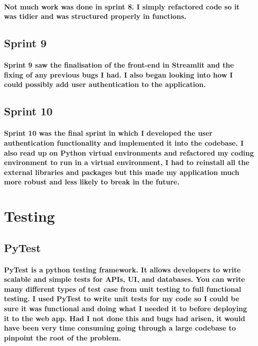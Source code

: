 \paragraph{Not much work was done in sprint 8. I simply refactored code so it was tidier and was structured properly in functions.}

\subsection{Sprint 9}
\paragraph{Sprint 9 saw the finalisation of the front-end in Streamlit and the fixing of any previous bugs I had. I also began looking into how I could possibly add user authentication to the application.}

\subsection{Sprint 10}
\paragraph{Sprint 10 was the final sprint in which I developed the user authentication functionality and implemented it into the codebase. I also read up on Python virtual environments and refactored my coding environment to run in a virtual environment, I had to reinstall all the external libraries and packages but this made my application much more robust and less likely to break in the future.}

\section{Testing}
\subsection{PyTest}
\paragraph{PyTest is a python testing framework. It allows developers to write scalable and simple tests for APIs, UI, and databases. You can write many different types of test case from unit testing to full functional testing. I used PyTest to write unit tests for my code so I could be sure it was functional and doing what I needed it to before deploying it to the web app. Had I not done this and bugs had arisen, it would have been very time consuming going through a large codebase to pinpoint the root of the problem.}

